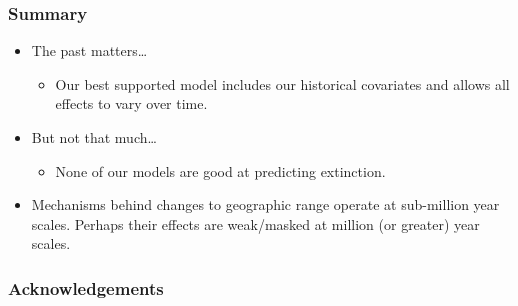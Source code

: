 \documentclass{beamer}
\begin{document}
\begin{frame}
  \frametitle{Summary}

  \begin{itemize}
    \item \alert{The past matters\dots} 
      \begin{itemize}
        \item Our best supported model includes our historical covariates and allows all effects to vary over time.
      \end{itemize}
    \item \alert{But not that much\dots}
      \begin{itemize}
        \item None of our models are good at predicting extinction.
      \end{itemize}
    \item<2-> Mechanisms behind changes to geographic range operate at sub-million year scales. Perhaps their effects are weak/masked at million (or greater) year scales.
  \end{itemize}

\end{frame}


\begin{frame}
  \frametitle{Acknowledgements}

\end{frame}
\end{document}
